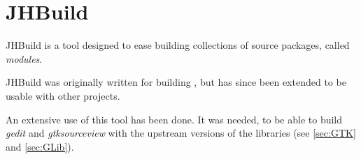 
\section[JHBuild]{JHBuild\cite{website:jhbuild}}\label{sec:jhbuild}

JHBuild is a tool designed to ease building collections of source packages, called \emph{modules}.

JHBuild was originally written for building \GNOME, but has since been extended to be usable with other projects.

An extensive use of this tool has been done. It was needed, to be able to build \emph{gedit} and \emph{gtksourceview} with the upstream versions of the libraries (see \ref{sec:GTK} and \ref{sec:GLib}).
